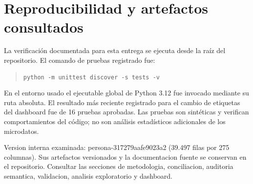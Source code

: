 \documentclass[12pt,letterpaper]{article}
\begin{document}
\newpage
\printbibliography[title={Referencias}]

\appendix
\section{Reproducibilidad y artefactos consultados}
La verificación documentada para esta entrega se ejecuta desde la raíz del repositorio. El comando de pruebas registrado fue:
\begin{quote}\small\texttt{python -m unittest discover -s tests -v}\end{quote}
En el entorno usado el ejecutable global de Python 3.12 fue invocado mediante su ruta absoluta. El resultado más reciente registrado para el cambio de etiquetas del dashboard fue de 16 pruebas aprobadas. Las pruebas son sintéticas y verifican comportamientos del código; no son análisis estadísticos adicionales de los microdatos.

Version interna examinada: persona-317279aafe9023a2 (39.497 filas por 275 columnas). Sus artefactos versionados y la documentacion fuente se conservan en el repositorio. Consultar las secciones de metodologia, conciliacion, auditoria semantica, validacion, analisis exploratorio y dashboard.
\end{document}
